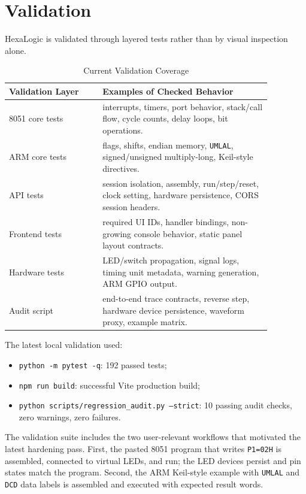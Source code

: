 \documentclass[conference]{IEEEtran}
\begin{document}
\section{Validation}
HexaLogic is validated through layered tests rather than by visual inspection alone.

\begin{table}[t]
\caption{Current Validation Coverage}
\label{tab:validation}
\centering
\begin{tabular}{p{0.31\linewidth} p{0.56\linewidth}}
\toprule
\textbf{Validation Layer} & \textbf{Examples of Checked Behavior} \\
\midrule
8051 core tests & interrupts, timers, port behavior, stack/call flow, cycle counts, delay loops, bit operations. \\
ARM core tests & flags, shifts, endian memory, \texttt{UMLAL}, signed/unsigned multiply-long, Keil-style directives. \\
API tests & session isolation, assembly, run/step/reset, clock setting, hardware persistence, CORS session headers. \\
Frontend tests & required UI IDs, handler bindings, non-growing console behavior, static panel layout contracts. \\
Hardware tests & LED/switch propagation, signal logs, timing unit metadata, warning generation, ARM GPIO output. \\
Audit script & end-to-end trace contracts, reverse step, hardware device persistence, waveform proxy, example matrix. \\
\bottomrule
\end{tabular}
\end{table}

The latest local validation used:

\begin{itemize}
\item \texttt{python -m pytest -q}: 192 passed tests;
\item \texttt{npm run build}: successful Vite production build;
\item \texttt{python scripts/regression\_audit.py --strict}: 10 passing audit checks, zero warnings, zero failures.
\end{itemize}

The validation suite includes the two user-relevant workflows that motivated the latest hardening pass. First, the pasted 8051 program that writes \texttt{P1=02H} is assembled, connected to virtual LEDs, and run; the LED devices persist and pin states match the program. Second, the ARM Keil-style example with \texttt{UMLAL} and \texttt{DCD} data labels is assembled and executed with expected result words.
\end{document}

